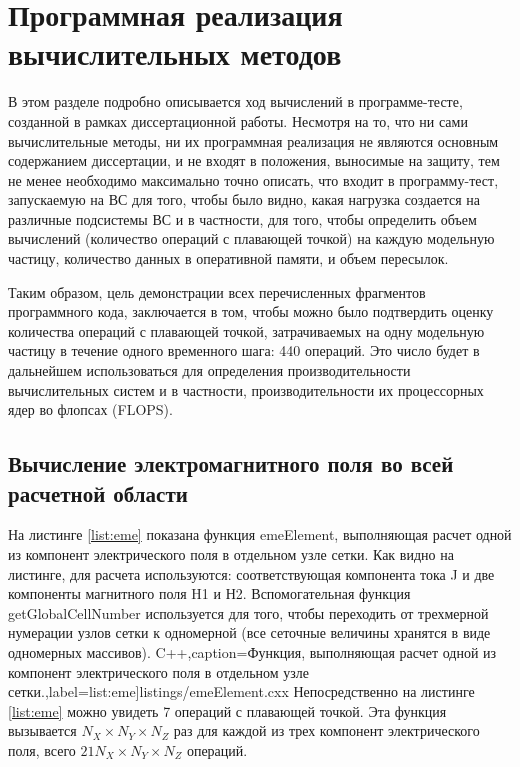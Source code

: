 \section{Программная реализация вычислительных методов}
   В этом разделе подробно описывается ход вычислений в программе-тесте, созданной в рамках диссертационной работы. Несмотря на то, что ни сами вычислительные методы, ни их программная реализация не являются основным содержанием диссертации, и не входят в положения, выносимые на защиту, тем не менее необходимо максимально точно описать, что входит в программу-тест, запускаемую на ВС для того, чтобы было видно, какая нагрузка создается на различные подсистемы ВС и в частности, для того, чтобы определить объем вычислений (количество операций с плавающей точкой) на каждую модельную частицу, количество данных в оперативной памяти, и объем пересылок.
   
   Таким образом, цель демонстрации всех перечисленных фрагментов программного кода, заключается в том, чтобы можно было подтвердить оценку количества операций с плавающей точкой, затрачиваемых на одну модельную частицу в течение одного временного шага: 440 операций. Это число будет в дальнейшем использоваться для определения производительности вычислительных систем и в частности, производительности их процессорных ядер во флопсах (FLOPS).  
   
   
\subsection{Вычисление электромагнитного поля во всей расчетной области}

На листинге \ref{list:eme} показана функция emeElement, выполняющая расчет одной из компонент электрического поля в отдельном узле сетки. Как видно на листинге, для расчета используются: соответствующая компонента тока J и две компоненты магнитного поля H1 и Н2. Вспомогательная функция getGlobalCellNumber используется для того, чтобы переходить от трехмерной нумерации узлов сетки к одномерной (все сеточные величины хранятся в виде одномерных массивов).    
\begingroup
\captiondelim{ } %
C++},caption={Функция, выполняющая расчет одной из компонент электрического поля в отдельном узле сетки.},label={list:eme}]{listings/emeElement.cxx}
\endgroup 
Непосредственно на листинге \ref{list:eme} можно увидеть 7 операций с плавающей точкой. Эта функция вызывается $N_X \times N_Y \times N_Z$ раз для каждой из трех компонент электрического поля, всего 
$21 N_X \times N_Y \times N_Z$ операций.

